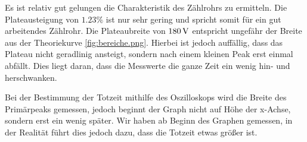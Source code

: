 Es ist relativ gut gelungen die Charakteristik des Zählrohrs zu ermitteln.
Die Plateausteigung von $1.23\%$ ist nur sehr gering und spricht somit für
ein gut arbeitendes Zählrohr. Die Plateaubreite von $180\,\si{\volt}$ entspricht
ungefähr der Breite aus der Theoriekurve \ref{fig:bereiche.png}. Hierbei
ist jedoch auffällig, dass das Plateau nicht geradlinig ansteigt, sondern
nach einem kleinen Peak erst einmal abfällt. Dies liegt daran, dass die
Messwerte die ganze Zeit ein wenig hin- und herschwanken.

Bei der Bestimmung der Totzeit mithilfe des Oszilloskops wird die Breite des Primärpeaks gemessen, jedoch beginnt der Graph nicht auf Höhe der x-Achse, sondern erst ein wenig
später. Wir haben ab Beginn des Graphen gemessen, in der Realität führt
dies jedoch dazu, dass die Totzeit etwas größer ist.
